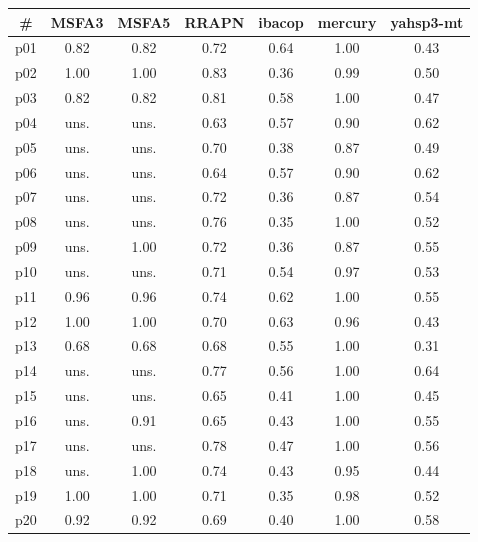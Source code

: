 \begin{tabular}{c||c|c|c|c|c|c}
\textbf{\#} & \textbf{MSFA3} & \textbf{MSFA5} & \textbf{RRAPN} & \textbf{ibacop} & \textbf{mercury} & \textbf{yahsp3-mt}\\
\hline
\hline
p01 & 0.82 & 0.82 & 0.72 & 0.64 & 1.00 & 0.43\\
p02 & 1.00 & 1.00 & 0.83 & 0.36 & 0.99 & 0.50\\
p03 & 0.82 & 0.82 & 0.81 & 0.58 & 1.00 & 0.47\\
p04 & uns. & uns. & 0.63 & 0.57 & 0.90 & 0.62\\
p05 & uns. & uns. & 0.70 & 0.38 & 0.87 & 0.49\\
p06 & uns. & uns. & 0.64 & 0.57 & 0.90 & 0.62\\
p07 & uns. & uns. & 0.72 & 0.36 & 0.87 & 0.54\\
p08 & uns. & uns. & 0.76 & 0.35 & 1.00 & 0.52\\
p09 & uns. & 1.00 & 0.72 & 0.36 & 0.87 & 0.55\\
p10 & uns. & uns. & 0.71 & 0.54 & 0.97 & 0.53\\
p11 & 0.96 & 0.96 & 0.74 & 0.62 & 1.00 & 0.55\\
p12 & 1.00 & 1.00 & 0.70 & 0.63 & 0.96 & 0.43\\
p13 & 0.68 & 0.68 & 0.68 & 0.55 & 1.00 & 0.31\\
p14 & uns. & uns. & 0.77 & 0.56 & 1.00 & 0.64\\
p15 & uns. & uns. & 0.65 & 0.41 & 1.00 & 0.45\\
p16 & uns. & 0.91 & 0.65 & 0.43 & 1.00 & 0.55\\
p17 & uns. & uns. & 0.78 & 0.47 & 1.00 & 0.56\\
p18 & uns. & 1.00 & 0.74 & 0.43 & 0.95 & 0.44\\
p19 & 1.00 & 1.00 & 0.71 & 0.35 & 0.98 & 0.52\\
p20 & 0.92 & 0.92 & 0.69 & 0.40 & 1.00 & 0.58\\
\end{tabular}

